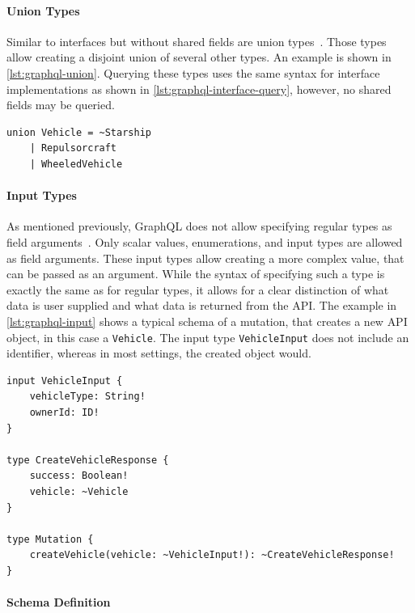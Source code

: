 \paragraph{Union Types}

Similar to interfaces but without shared fields are union types~\cite{Facebook2018, Diaz2020}.
Those types allow creating a disjoint union of several other types.
An example is shown in \autoref{lst:graphql-union}.
Querying these types uses the same syntax for interface implementations as shown in \autoref{lst:graphql-interface-query}, however, no shared fields may be queried. 

\begin{lstlisting}[caption={Union Types in GraphQL}, language=graphqls, label={lst:graphql-union}]
union Vehicle = ~Starship
    | Repulsorcraft
    | WheeledVehicle
\end{lstlisting}

\paragraph{Input Types} 

As mentioned previously, GraphQL does not allow specifying regular types as field arguments~\cite{Facebook2018}.
Only scalar values, enumerations, and input types are allowed as field arguments.
These input types allow creating a more complex value, that can be passed as an argument.
While the syntax of specifying such a type is exactly the same as for regular types, it allows for a clear distinction of what data is user supplied and what data is returned from the \ac{API}.
The example in \autoref{lst:graphql-input} shows a typical schema of a mutation, that creates a new \ac{API} object, in this case a \texttt{Vehicle}.
The input type \texttt{VehicleInput} does not include an identifier, whereas in most settings, the created object would.

\begin{lstlisting}[caption={Input Types}, language=graphqls, label={lst:graphql-input}]
input VehicleInput {
    vehicleType: String!
    ownerId: ID!
}

type CreateVehicleResponse {
    success: Boolean!
    vehicle: ~Vehicle
}

type Mutation {
    createVehicle(vehicle: ~VehicleInput!): ~CreateVehicleResponse!
}
\end{lstlisting}

\paragraph{Schema Definition}

